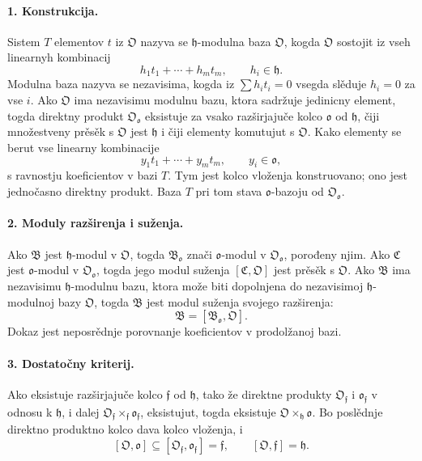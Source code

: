 \documentclass[11pt]{article}
\begin{document}
\paragraph{1. Konstrukcija.}
Sistem \(T\) elementov \(t\) iz \(\mathfrak O\) nazyva se \(\mathfrak h\)-modulna baza \(\mathfrak O\), kogda \(\mathfrak O\) sostojit iz vseh linearnyh kombinacij
\[
        h_1t_1+\cdots+h_mt_m,
        \qquad h_i\in\mathfrak h.
\]
Modulna baza nazyva se nezavisima, kogda iz \(\sum h_it_i=0\) vsegda slěduje \(h_i=0\) za vse \(i\). Ako \(\mathfrak O\) ima nezavisimu modulnu bazu, ktora sadržuje jedinicny element, togda direktny produkt \(\mathfrak O_{\mathfrak o}\) eksistuje za vsako razširjajuče kolco \(\mathfrak o\) od \(\mathfrak h\), čiji množestveny prěsěk s \(\mathfrak O\) jest \(\mathfrak h\) i čiji elementy komutujut s \(\mathfrak O\). Kako elementy se berut vse linearny kombinacije
\[
        y_1t_1+\cdots+y_mt_m,
        \qquad y_i\in\mathfrak o,
\]
s ravnostju koeficientov v bazi \(T\). Tym jest kolco vloženja konstruovano; ono jest jednočasno direktny produkt. Baza \(T\) pri tom stava \(\mathfrak o\)-bazoju od \(\mathfrak O_{\mathfrak o}\).

\paragraph{2. Moduly razširenja i suženja.}
Ako \(\mathfrak B\) jest \(\mathfrak h\)-modul v \(\mathfrak O\), togda \(\mathfrak B_{\mathfrak o}\) znači \(\mathfrak o\)-modul v \(\mathfrak O_{\mathfrak o}\), porođeny njim. Ako \(\mathfrak C\) jest \(\mathfrak o\)-modul v \(\mathfrak O_{\mathfrak o}\), togda jego modul suženja \([\mathfrak C,\mathfrak O]\) jest prěsěk s \(\mathfrak O\). Ako \(\mathfrak B\) ima nezavisimu \(\mathfrak h\)-modulnu bazu, ktora može biti dopolnjena do nezavisimoj \(\mathfrak h\)-modulnoj bazy \(\mathfrak O\), togda \(\mathfrak B\) jest modul suženja svojego razširenja:
\[
        \mathfrak B=[\mathfrak B_{\mathfrak o},\mathfrak O].
\]
Dokaz jest neposrědnje porovnanje koeficientov v prodolžanoj bazi.

\paragraph{3. Dostatočny kriterij.}
Ako eksistuje razširjajuče kolco \(\mathfrak f\) od \(\mathfrak h\), tako že direktne produkty \(\mathfrak O_{\mathfrak f}\) i \(\mathfrak o_{\mathfrak f}\) v odnosu k \(\mathfrak h\), i dalej \(\mathfrak O_{\mathfrak f}\times_{\mathfrak f}\mathfrak o_{\mathfrak f}\), eksistujut, togda eksistuje \(\mathfrak O\times_{\mathfrak h}\mathfrak o\). Bo poslědnje direktno produktno kolco dava kolco vloženja, i
\[
        [\mathfrak O,\mathfrak o]\subseteq [\mathfrak O_{\mathfrak f},\mathfrak o_{\mathfrak f}]=\mathfrak f,
        \qquad [\mathfrak O,\mathfrak f]=\mathfrak h.
\]
\end{document}
